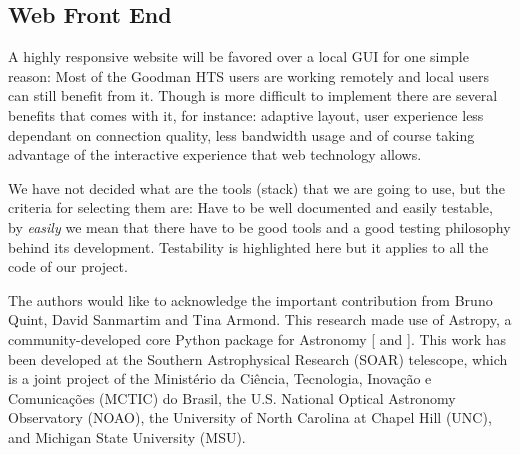 \documentclass[11pt,twoside]{article}
\begin{document}
\subsection{Web Front End}
A highly responsive website will be favored over a local GUI for one simple reason: Most of the Goodman HTS users are working remotely and local users can still benefit from it. Though is more difficult to implement there are several benefits that comes with it, for instance: adaptive layout, user experience less dependant on connection quality, less bandwidth usage and of course taking advantage of the interactive experience that web technology allows.

We have not decided what are the tools (stack) that we are going to use, but the criteria for selecting them are: Have to be well documented and easily testable, by \emph{easily} we mean that there have to be good tools and a good testing philosophy behind its development. Testability is highlighted here but it applies to all the code of our project.


\acknowledgements The authors would like to acknowledge the important contribution from Bruno Quint, David Sanmartim and Tina Armond. This research made use of Astropy, a community-developed core Python package for Astronomy [ \citet{2013A&A...558A..33A} and \citet{2018AJ....156..123A} ]. This work has been developed at the Southern Astrophysical Research (SOAR) telescope, which is a joint project of the Minist\'erio da Ci\^encia, Tecnologia, Inova\c{c}\~ao e Comunica\c{c}\~oes (MCTIC) do Brasil, the U.S. National Optical Astronomy Observatory (NOAO), the University of North Carolina at Chapel Hill (UNC), and Michigan State University (MSU). 


\end{document}
